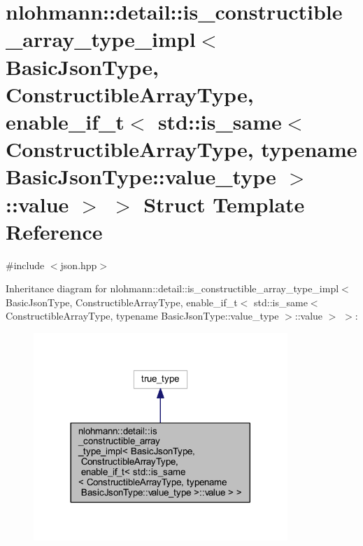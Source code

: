 \hypertarget{structnlohmann_1_1detail_1_1is__constructible__array__type__impl_3_01_basic_json_type_00_01_cons8cf88e17d5eaa68665a8fb4b97604b0e}{}\section{nlohmann\+::detail\+::is\+\_\+constructible\+\_\+array\+\_\+type\+\_\+impl$<$ Basic\+Json\+Type, Constructible\+Array\+Type, enable\+\_\+if\+\_\+t$<$ std\+::is\+\_\+same$<$ Constructible\+Array\+Type, typename Basic\+Json\+Type\+::value\+\_\+type $>$\+::value $>$ $>$ Struct Template Reference}
\label{structnlohmann_1_1detail_1_1is__constructible__array__type__impl_3_01_basic_json_type_00_01_cons8cf88e17d5eaa68665a8fb4b97604b0e}


{\ttfamily \#include $<$json.\+hpp$>$}



Inheritance diagram for nlohmann\+::detail\+::is\+\_\+constructible\+\_\+array\+\_\+type\+\_\+impl$<$ Basic\+Json\+Type, Constructible\+Array\+Type, enable\+\_\+if\+\_\+t$<$ std\+::is\+\_\+same$<$ Constructible\+Array\+Type, typename Basic\+Json\+Type\+::value\+\_\+type $>$\+::value $>$ $>$\+:
\nopagebreak
\begin{figure}[H]
\begin{center}
\leavevmode
\includegraphics[width=272pt]{structnlohmann_1_1detail_1_1is__constructible__array__type__impl_3_01_basic_json_type_00_01_cons94f7bc79d45277c3004dcf8c289593af}
\end{center}
\end{figure}


